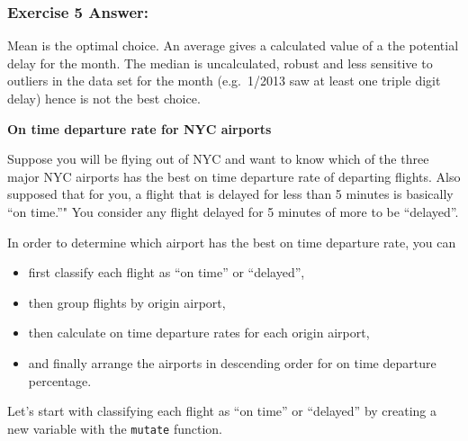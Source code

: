 \documentclass[
]{article}
\newenvironment{Shaded}{\begin{snugshade}}{\end{snugshade}}
\newcommand{\DataTypeTok}[1]{\textcolor[rgb]{0.13,0.29,0.53}{#1}}
\newcommand{\DecValTok}[1]{\textcolor[rgb]{0.00,0.00,0.81}{#1}}
\newcommand{\KeywordTok}[1]{\textcolor[rgb]{0.13,0.29,0.53}{\textbf{#1}}}
\newcommand{\NormalTok}[1]{#1}
\newcommand{\OperatorTok}[1]{\textcolor[rgb]{0.81,0.36,0.00}{\textbf{#1}}}
\newcommand{\StringTok}[1]{\textcolor[rgb]{0.31,0.60,0.02}{#1}}
\providecommand{\tightlist}{%
  \setlength{\itemsep}{0pt}\setlength{\parskip}{0pt}}
\begin{document}
\hypertarget{exercise-5-answer}{%
\subsubsection{\texorpdfstring{\textbf{Exercise 5
Answer:}}{Exercise 5 Answer:}}\label{exercise-5-answer}}

Mean is the optimal choice. An average gives a calculated value of a the
potential delay for the month. The median is uncalculated, robust and
less sensitive to outliers in the data set for the month (e.g.~1/2013
saw at least one triple digit delay) hence is not the best choice.

\textbf{On time departure rate for NYC airports}

Suppose you will be flying out of NYC and want to know which of the
three major NYC airports has the best on time departure rate of
departing flights. Also supposed that for you, a flight that is delayed
for less than 5 minutes is basically ``on time.''" You consider any
flight delayed for 5 minutes of more to be ``delayed''.

In order to determine which airport has the best on time departure rate,
you can

\begin{itemize}
\tightlist
\item
  first classify each flight as ``on time'' or ``delayed'',
\item
  then group flights by origin airport,
\item
  then calculate on time departure rates for each origin airport,
\item
  and finally arrange the airports in descending order for on time
  departure percentage.
\end{itemize}

Let's start with classifying each flight as ``on time'' or ``delayed''
by creating a new variable with the \texttt{mutate} function.

\begin{Shaded}
\end{Shaded}
\end{document}

